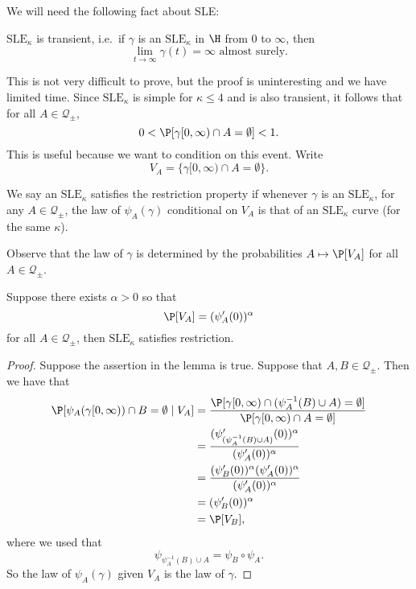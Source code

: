 \documentclass[a4paper]{article}
\newcommand\SLE{\mathrm{SLE}}
\begin{document}
We will need the following fact about SLE:
\begin{fact}
  $\SLE_\kappa$ is transient, i.e.\ if $\gamma$ is an $\SLE_\kappa$ in $\H$ from $0$ to $\infty$, then
  \[
    \lim_{t \to \infty} \gamma(t) = \infty\text{ almost surely}.
  \]
\end{fact}
This is not very difficult to prove, but the proof is uninteresting and we have limited time. Since $\SLE_\kappa$ is simple for $\kappa \leq 4$ and is also transient, it follows that for all $A \in \mathcal{Q}_{\pm}$,
\[
  0 < \P[\gamma[0, \infty) \cap A = \emptyset] < 1.
\]
This is useful because we want to condition on this event. Write
\[
  V_A = \{\gamma[0, \infty) \cap A = \emptyset\}.
\]
\begin{defi}
  We say an $\SLE_\kappa$ satisfies the restriction property if whenever $\gamma$ is an $\SLE_\kappa$, for any $A \in \mathcal{Q}_{\pm}$, the law of $\psi_A(\gamma)$ conditional on $V_A$ is that of an $\SLE_\kappa$ curve (for the same $\kappa$).
\end{defi}

Observe that the law of $\gamma$ is determined by the probabilities $A \mapsto \P[V_A]$ for all $A \in \mathcal{Q}_{\pm}$.

\begin{lemma}
  Suppose there exists $\alpha > 0$ so that
  \[
    \P[V_A] = (\psi_A'(0))^\alpha
  \]
  for all $A \in \mathcal{Q}_{\pm}$, then $\SLE_\kappa$ satisfies restriction.
\end{lemma}

\begin{proof}
  Suppose the assertion in the lemma is true. Suppose that $A, B \in \mathcal{Q}_{\pm}$. Then we have that
  \begin{align*}
    \P[\psi_A(\gamma[0, \infty)) \cap B = \emptyset \mid V_A] &= \frac{\P[\gamma[0, \infty) \cap (\psi_A^{-1}(B) \cup A) = \emptyset]}{\P[\gamma[0, \infty) \cap A = \emptyset]}\\
    &= \frac{(\psi_{(\psi_A^{-1}(B) \cup A)}'(0))^\alpha}{(\psi_A'(0))^\alpha}\\
    &= \frac{(\psi_B'(0))^\alpha (\psi_A'(0))^\alpha}{(\psi_A'(0))^\alpha}\\
    &= (\psi_B'(0))^\alpha\\
    &= \P[V_B],
  \end{align*}
  where we used that
  \[
    \psi_{\psi_A^{-1}(B) \cup A} = \psi_B \circ \psi_A.
  \]
  So the law of $\psi_A(\gamma)$ given $V_A$ is the law of $\gamma$.
\end{proof}
\end{document}
